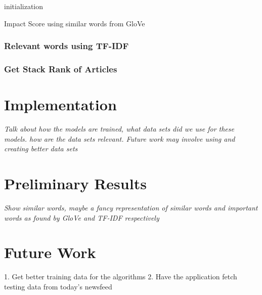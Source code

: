 \documentclass{article}
\begin{document}
\begin{center}
\begin{algorithm}[H]
\SetAlgoLined
 initialization\;
 \caption{Impact Score using similar words from GloVe }
\end{algorithm}
\end{center}

\subsubsection {Relevant words using TF-IDF}

\subsubsection {Get Stack Rank of Articles}

\maketitle 
\section{Implementation} %
 \textit{Talk about how the models are trained, what data sets did we use for these models. how are the data sets relevant. Future work may involve using and creating better data sets}
 
 \maketitle
\section{Preliminary Results} %
\textit{Show similar words, maybe a fancy representation of similar words and important words as found by GloVe and TF-IDF respectively}

\maketitle
\section {Future Work}
1. Get better training data for the algorithms
2. Have the application fetch testing data from today's newsfeed
\end{document}
